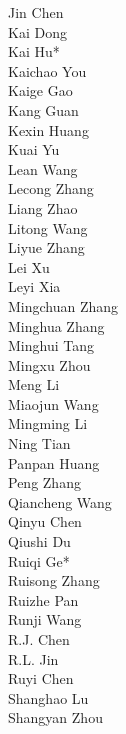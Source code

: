 \documentclass[11pt, a4paper, logo, copyright, nonumbering]{deepseek}
\begin{document}
{\begin{multicols}{2}
\color{damaiblue} Jin Chen \\
\color{damaiblue} Kai Dong \\
\color{damaiblue} Kai Hu* \\
\color{damaiblue} Kaichao You \\
\color{damaiblue} Kaige Gao \\
\color{damaiblue} Kang Guan \\
\color{damaiblue} Kexin Huang \\
\color{damaiblue} Kuai Yu \\
\color{damaiblue} Lean Wang \\
\color{damaiblue} Lecong Zhang \\
\color{damaiblue} Liang Zhao \\
\color{damaiblue} Litong Wang \\
\color{damaiblue} Liyue Zhang \\
\color{damaiblue} Lei Xu \\
\color{damaiblue} Leyi Xia \\
\color{damaiblue} Mingchuan Zhang \\
\color{damaiblue} Minghua Zhang \\
\color{damaiblue} Minghui Tang \\
\color{damaiblue} Mingxu Zhou \\
\color{damaiblue} Meng Li \\
\color{damaiblue} Miaojun Wang \\
\color{damaiblue} Mingming Li \\
\color{damaiblue} Ning Tian \\
\color{damaiblue} Panpan Huang \\
\color{damaiblue} Peng Zhang \\
\color{damaiblue} Qiancheng Wang \\
\color{damaiblue} Qinyu Chen \\
\color{damaiblue} Qiushi Du \\
\color{damaiblue} Ruiqi Ge* \\
\color{damaiblue} Ruisong Zhang \\
\color{damaiblue} Ruizhe Pan \\
\color{damaiblue} Runji Wang \\
\color{damaiblue} R.J. Chen \\
\color{damaiblue} R.L. Jin \\
\color{damaiblue} Ruyi Chen \\
\color{damaiblue} Shanghao Lu \\
\color{damaiblue} Shangyan Zhou \\

\end{multicols}}
\end{document}
